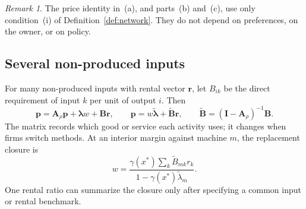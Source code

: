 \documentclass[12pt]{article}
\theoremstyle{plain}
\theoremstyle{definition}
\theoremstyle{remark}
\newtheorem*{remark}{Remark}
\begin{document}
\begin{remark}
The price identity in~(a), and parts~(b) and~(c), use only condition~(i) of Definition~\ref{def:network}. They do not depend on preferences, on the owner, or on policy.
\end{remark}

\subsection{Several non-produced inputs}\label{app:inputs}

For many non-produced inputs with rental vector $\mathbf{r}$, let $B_{ik}$ be the direct requirement of input $k$ per unit of output $i$. Then
\[
\mathbf{p}=\mathbf{A}_\rho\mathbf{p}+\boldsymbol{\lambda}w+\mathbf{B}\mathbf{r},\qquad
\mathbf{p}=w\widetilde{\boldsymbol{\lambda}}+\widetilde{\mathbf{B}}\mathbf{r},\qquad
\widetilde{\mathbf{B}}=(\mathbf{I}-\mathbf{A}_\rho)^{-1}\mathbf{B}.
\]
The matrix records which good or service each activity uses; it changes when firms switch methods. At an interior margin against machine $m$, the replacement closure is
\[
w=\frac{\gamma(x^*)\sum_k\widetilde{B}_{mk}r_k}{1-\gamma(x^*)\widetilde{\lambda}_m}.
\]
One rental ratio can summarize the closure only after specifying a common input or rental benchmark.
\end{document}
